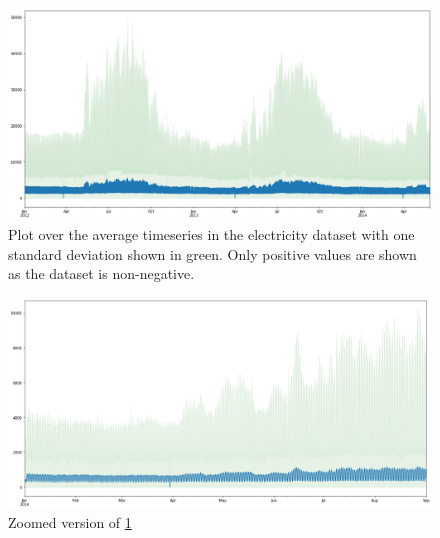 \begin{figure}[htb]
  \centering
  \includegraphics[width=\linewidth]{./img/electricity_plot.png}
  \caption{Plot over the average timeseries in the electricity dataset with one standard deviation shown in green. Only positive values are shown as the dataset is non-negative.}
  \label{fig:electricity_plot}
  \endminipage\hfill
\end{figure}

\begin{figure}[htb]
  \centering
  \includegraphics[width=\linewidth]{./img/electricity_no_negative.png}
  \caption{Zoomed version of \ref{fig:electricity_plot}}
  \label{fig:electricity_plot_zooomed}
  \endminipage\hfill
\end{figure}

